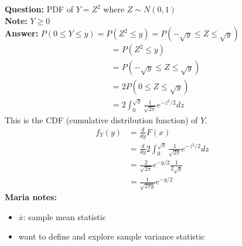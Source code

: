 \documentclass{article}
\begin{document}
\textbf{Question: } PDF of $Y = Z^2$ where $Z \sim N(0,1)$\\
\textbf{Note: } $Y \geq 0$\\
\textbf{Answer: } $P(0 \leq Y \leq y) = P(Z^2 \leq y) = P(-\sqrt{y} \leq Z \leq \sqrt{y})$\\
\begin{align*}
    &= P(Z^2 \leq y)\\
    &= P(-\sqrt{y} \leq Z \leq \sqrt{y})\\
    &= 2 P(0 \leq Z \leq \sqrt{y})\\
    &= 2 \int_{0}^{\sqrt{y}} \frac{1}{\sqrt{2\pi}} e^{-z^2/2} dz
\end{align*}
This is the CDF (cumulative distribution function) of $Y$.
\begin{align*}    
f_Y(y) &= \frac{d}{dy} F(x)\\
&= \frac{d}{dy} 2 \int_{0}^{\sqrt{y}} \frac{1}{\sqrt{2\pi}} e^{-z^2/2} dz\\
&= \frac{2}{\sqrt{2\pi}} e^{-y/2} \frac{1}{2\sqrt{y}}\\
&= \frac{1}{\sqrt{2\pi y}} e^{-y/2}
\end{align*}
\textbf{Maria notes:}
\begin{itemize}
    \item $\overline{x}$: sample mean statistic
    \item want to define and explore sample variance statistic
    \end{itemize}
\end{document}
